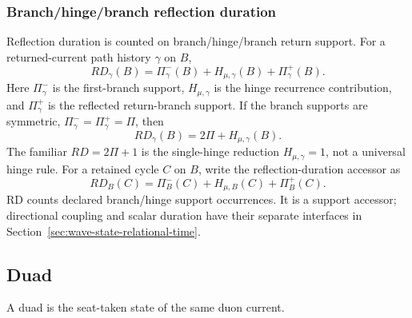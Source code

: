 \subsubsection{Branch/hinge/branch reflection duration}
\label{subsec:branch-hinge-rd}
Reflection duration is counted on branch/hinge/branch return support. For a returned-current path history \(\gamma\) on \(B\),
\begin{equation}
RD_\gamma(B)
=
\Pi^-_\gamma(B)
+
H_{\mu,\gamma}(B)
+
\Pi^+_\gamma(B).
\label{eq:branch-hinge-rd}
\end{equation}
Here \(\Pi^-_\gamma\) is the first-branch support, \(H_{\mu,\gamma}\) is the hinge recurrence contribution, and \(\Pi^+_\gamma\) is the reflected return-branch support. If the branch supports are symmetric, \(\Pi^-_\gamma=\Pi^+_\gamma=\Pi\), then
\begin{equation}
RD_\gamma(B)=2\Pi+H_{\mu,\gamma}(B).
\label{eq:branch-hinge-rd-symmetric}
\end{equation}
The familiar \(RD=2\Pi+1\) is the single-hinge reduction \(H_{\mu,\gamma}=1\), not a universal hinge rule. For a retained cycle \(C\) on \(B\), write the reflection-duration accessor as
\[
RD_B(C)=\Pi^-_B(C)+H_{\mu,B}(C)+\Pi^+_B(C).
\]
RD counts declared branch/hinge support occurrences. It is a support accessor; directional coupling and scalar duration have their separate interfaces in Section~\ref{sec:wave-state-relational-time}.

\subsection{Duad}
\label{subsec:duad}
\begin{definition}
A duad is the seat-taken state of the same duon current.
\end{definition}


